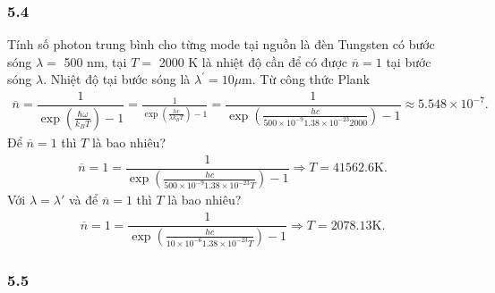 \documentclass{report}
\newcommand{\f}[2]{\dfrac{#1}{#2}}
\begin{document}
\subsubsection*{5.4}
Tính số photon trung bình cho từng mode tại nguồn là đèn Tungsten có bước sóng $\lambda =$ 500 nm, tại $T = $ 2000 K là nhiệt độ cần để có được $\overline{n} = 1$ tại bước sóng $\lambda$. Nhiệt độ tại bước sóng là $\lambda^{'} = 10 \mu$m. Từ công thức Plank
\begin{align*}
	\overline{n} = \f{1}{\exp(\frac{\hbar \omega}{k_{B} T}) - 1} = \frac{1}{\exp(\frac{hc}{\lambda k_{B} T}) - 1} = \f{1}{\exp(\frac{hc}{500\times 10^{-9} 1.38 \times 10^{-23} 2000}) - 1} \approx 5.548 \times 10^{-7}. %
\end{align*}
Để $\overline{n} = 1$ thì $T$ là bao nhiêu?
\begin{align*}
	\overline{n} = 1 = \f{1}{\exp(\frac{hc}{500\times 10^{-9} 1.38 \times 10^{-23} T}) - 1} \Rightarrow T = 41562.6 \text{K}.
\end{align*}
Với $\lambda = \lambda'$ và để $\overline{n} = 1$ thì $T$ là bao nhiêu?
\begin{align*}
	\overline{n} = 1 = \f{1}{\exp(\frac{hc}{10 \times 10^{-6} 1.38 \times 10^{-23} T}) - 1} \Rightarrow T = 2078.13 \text{K}.
\end{align*}
\subsubsection*{5.5}
\end{document}
